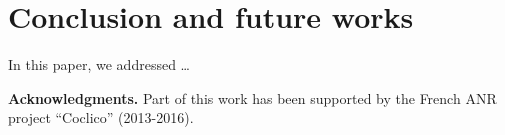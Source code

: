 \documentclass[twocolumn,english]{article}
\begin{document}
\section{Conclusion and future works}

In this paper, we addressed \ldots


\bigskip
\noindent
\textbf{Acknowledgments.} Part of this work has been supported by the French ANR project ``Coclico'' (2013-2016). 







%
%
%
%
%

\end{document}
